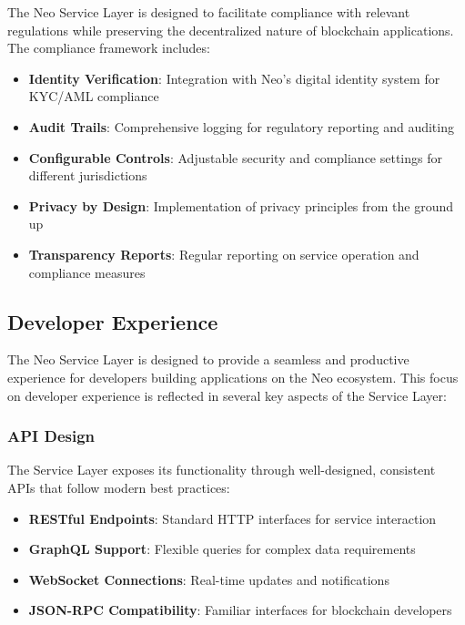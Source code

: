The Neo Service Layer is designed to facilitate compliance with relevant regulations while preserving the decentralized nature of blockchain applications. The compliance framework includes:

\begin{itemize}
    \item \textbf{Identity Verification}: Integration with Neo's digital identity system for KYC/AML compliance
    \item \textbf{Audit Trails}: Comprehensive logging for regulatory reporting and auditing
    \item \textbf{Configurable Controls}: Adjustable security and compliance settings for different jurisdictions
    \item \textbf{Privacy by Design}: Implementation of privacy principles from the ground up
    \item \textbf{Transparency Reports}: Regular reporting on service operation and compliance measures
\end{itemize}

\subsection{Developer Experience}
\label{subsec:nsl-developer}

The Neo Service Layer is designed to provide a seamless and productive experience for developers building applications on the Neo ecosystem. This focus on developer experience is reflected in several key aspects of the Service Layer:

\subsubsection{API Design}
\label{subsubsec:api-design}

The Service Layer exposes its functionality through well-designed, consistent APIs that follow modern best practices:

\begin{itemize}
    \item \textbf{RESTful Endpoints}: Standard HTTP interfaces for service interaction
    \item \textbf{GraphQL Support}: Flexible queries for complex data requirements
    \item \textbf{WebSocket Connections}: Real-time updates and notifications
    \item \textbf{JSON-RPC Compatibility}: Familiar interfaces for blockchain developers
\end{itemize}

